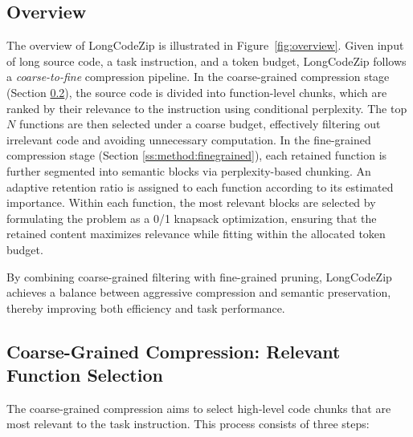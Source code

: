 \documentclass[10pt,conference]{IEEEtran}
\newcommand{\todoc}[2]{{\textcolor{#1}{\textbf{[#2]}}}}
\newcommand{\shi}[1]{\todoc{orange}{Shi: #1}}
\newcommand{\approach}{{LongCodeZip}\xspace} %
\begin{document}
\subsection{Overview}

The overview of \approach is illustrated in Figure~\ref{fig:overview}. 
Given input of long source code, a task instruction, and a token budget, \approach follows a \emph{coarse-to-fine} compression pipeline. 
In the coarse-grained compression stage (Section \ref{ss:method:coarse}), the source code is divided into function-level chunks, which are ranked by their relevance to the instruction using conditional perplexity. The top \(N\) functions are then selected under a coarse budget, effectively filtering out irrelevant code and avoiding unnecessary computation.
In the fine-grained compression stage (Section \ref{ss:method:finegrained}), each retained function is further segmented into semantic blocks via perplexity-based chunking. An adaptive retention ratio is assigned to each function according to its estimated importance. Within each function, the most relevant blocks are selected by formulating the problem as a 0/1 knapsack optimization, ensuring that the retained content maximizes relevance while fitting within the allocated token budget.

By combining coarse-grained filtering with fine-grained pruning, \approach achieves a balance between aggressive compression and semantic preservation, thereby improving both efficiency and task performance.

\subsection{Coarse-Grained Compression: Relevant Function Selection}
\label{ss:method:coarse}
The coarse-grained compression aims to select high-level code chunks that are most relevant to the task instruction. This process consists of three steps: 
\end{document}
